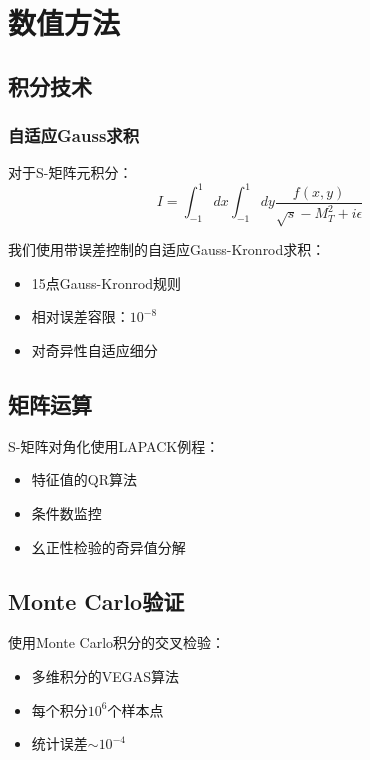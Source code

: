 \section{数值方法}
\label{app:numerical}

\subsection{积分技术}

\subsubsection{自适应Gauss求积}

对于S-矩阵元积分：
\begin{equation}
    I = \int_{-1}^1 dx \int_{-1}^1 dy \frac{f(x,y)}{\sqrt{s} - M_T^2 + i\epsilon}
\end{equation}

我们使用带误差控制的自适应Gauss-Kronrod求积：
\begin{itemize}
    \item 15点Gauss-Kronrod规则
    \item 相对误差容限：$10^{-8}$
    \item 对奇异性自适应细分
\end{itemize}

\subsection{矩阵运算}

S-矩阵对角化使用LAPACK例程：
\begin{itemize}
    \item 特征值的QR算法
    \item 条件数监控
    \item 幺正性检验的奇异值分解
\end{itemize}

\subsection{Monte Carlo验证}

使用Monte Carlo积分的交叉检验：
\begin{itemize}
    \item 多维积分的VEGAS算法
    \item 每个积分$10^6$个样本点
    \item 统计误差$\sim 10^{-4}$
\end{itemize}


